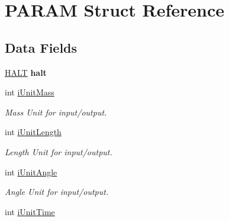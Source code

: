 \hypertarget{struct_p_a_r_a_m}{}\section{P\+A\+R\+A\+M Struct Reference}
\label{struct_p_a_r_a_m}
\subsection*{Data Fields}
\begin{DoxyCompactItemize}
\item 
\hypertarget{struct_p_a_r_a_m_a3f4a5e9d26ccb9f662ecbb2a2e453a3c}{}\hyperlink{struct_h_a_l_t}{H\+A\+L\+T} {\bfseries halt}\label{struct_p_a_r_a_m_a3f4a5e9d26ccb9f662ecbb2a2e453a3c}

\item 
\hypertarget{struct_p_a_r_a_m_a5cc94d58c499a8a3c6f8b8b34161784a}{}int \hyperlink{struct_p_a_r_a_m_a5cc94d58c499a8a3c6f8b8b34161784a}{i\+Unit\+Mass}\label{struct_p_a_r_a_m_a5cc94d58c499a8a3c6f8b8b34161784a}

\begin{DoxyCompactList}\small\item\em Mass Unit for input/output. \end{DoxyCompactList}\item 
\hypertarget{struct_p_a_r_a_m_a4e840d0d567f442c638f5b18e5b96cbe}{}int \hyperlink{struct_p_a_r_a_m_a4e840d0d567f442c638f5b18e5b96cbe}{i\+Unit\+Length}\label{struct_p_a_r_a_m_a4e840d0d567f442c638f5b18e5b96cbe}

\begin{DoxyCompactList}\small\item\em Length Unit for input/output. \end{DoxyCompactList}\item 
\hypertarget{struct_p_a_r_a_m_a0e9718a1354fea8fcc31ebb1a2f53fcf}{}int \hyperlink{struct_p_a_r_a_m_a0e9718a1354fea8fcc31ebb1a2f53fcf}{i\+Unit\+Angle}\label{struct_p_a_r_a_m_a0e9718a1354fea8fcc31ebb1a2f53fcf}

\begin{DoxyCompactList}\small\item\em Angle Unit for input/output. \end{DoxyCompactList}\item 
\hypertarget{struct_p_a_r_a_m_a5a57b9f6c9fbc7f66e696fca6b66bc9d}{}int \hyperlink{struct_p_a_r_a_m_a5a57b9f6c9fbc7f66e696fca6b66bc9d}{i\+Unit\+Time}\label{struct_p_a_r_a_m_a5a57b9f6c9fbc7f66e696fca6b66bc9d}


\end{DoxyCompactItemize}
